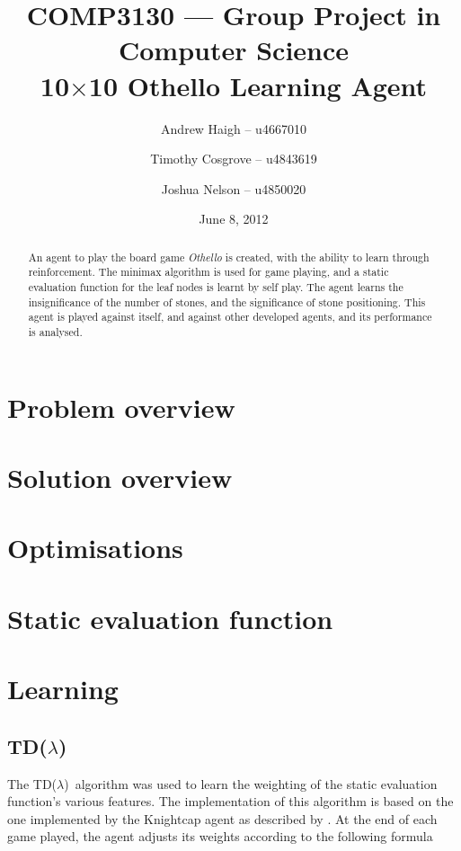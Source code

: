 \documentclass[11pt]{article}
\title{%
  COMP3130 --- Group Project in Computer Science \\
  10$\times$10 Othello Learning Agent}
\date{June 8, 2012}
\author{%
  Andrew Haigh -- u4667010 \and
  Timothy Cosgrove -- u4843619 \and
  Joshua Nelson -- u4850020}
\newcommand{\tdl}{TD($\lambda$)}
\begin{document}
\maketitle
\begin{abstract}
An agent to play the board game \emph{Othello} is created, with the ability to
learn through reinforcement. The minimax algorithm is used for game playing,
and a static evaluation function for the leaf nodes is learnt by self play.
The agent learns the insignificance of the number of stones, and the
significance of stone positioning. This agent is played against itself, and
against other developed agents, and its performance is analysed.
\end{abstract}
\clearpage

\section{Problem overview}

\section{Solution overview}

\section{Optimisations}

\section{Static evaluation function}

\section{Learning}

\subsection{\tdl}

The \tdl\ algorithm was used to learn the weighting of the static evaluation
function's various features. The implementation of this algorithm is based on
the one implemented by the Knightcap agent as described by \citet{Baxter1997}.
At the end of each game played, the agent adjusts its weights according to
the following formula
\end{document}
